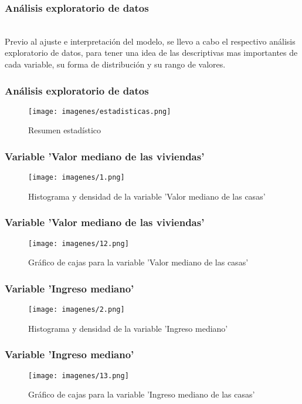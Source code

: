 \documentclass[12pt]{beamer}
\begin{document}
\begin{frame}
\frametitle{Análisis exploratorio de datos}
~\\ Previo al ajuste e interpretación del modelo, se llevo a cabo el respectivo análisis exploratorio de datos, para tener una idea de las descriptivas mas importantes de cada variable, su forma de distribución y su rango de valores.
\end{frame}

\begin{frame}
\frametitle{Análisis exploratorio de datos}
\begin{figure}[!h]
    \begin{center}
        \texttt{[image: imagenes/estadisticas.png]}
        \caption{Resumen estadístico}
        \label{fig:Densidad}
    \end{center}
\end{figure}

\end{frame}
\begin{frame}
\frametitle{Variable 'Valor mediano de las viviendas'}
\begin{figure}[!h]
    \begin{center}
        \texttt{[image: imagenes/1.png]}
        \caption{Histograma y densidad de la variable 'Valor mediano de las casas'}
        \label{fig:Densidad}
    \end{center}
\end{figure}
\end{frame}
\begin{frame}
\frametitle{Variable 'Valor mediano de las viviendas'}
\begin{figure}[!h]
    \begin{center}
        \texttt{[image: imagenes/12.png]}
        \caption{Gráfico de cajas para la variable 'Valor mediano de las casas'}
        \label{fig:Densidad}
    \end{center}
\end{figure}
\end{frame}

\begin{frame}
\frametitle{Variable 'Ingreso mediano'}
\begin{figure}[!h]
    \begin{center}
        \texttt{[image: imagenes/2.png]}
        \caption{Histograma y densidad de la variable 'Ingreso mediano'}
        \label{fig:Densidad}
    \end{center}
\end{figure}
\end{frame}
\begin{frame}
\frametitle{Variable 'Ingreso mediano'}
\begin{figure}[!h]
    \begin{center}
        \texttt{[image: imagenes/13.png]}
        \caption{Gráfico de cajas para la variable 'Ingreso mediano de las casas'}
        \label{fig:Densidad}
    \end{center}
\end{figure}
\end{frame}
\end{document}
